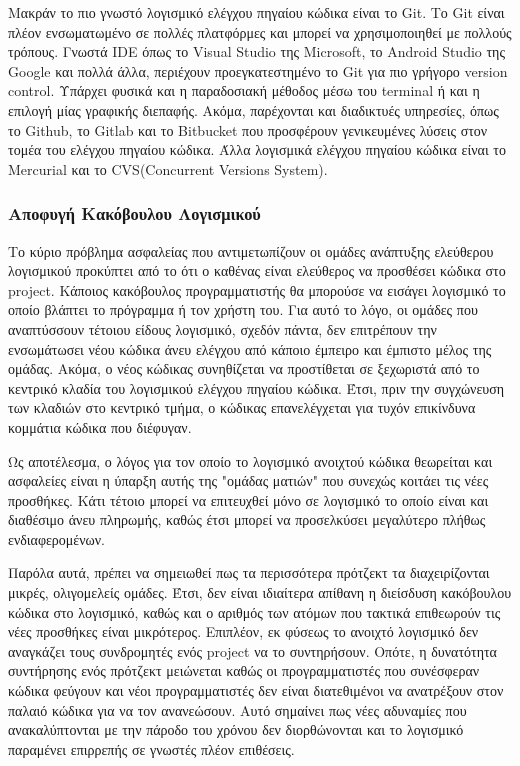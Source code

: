 \documentclass[a4paper, 11pt]{article}
\begin{document}
{{Μακράν το πιο γνωστό λογισμικό ελέγχου πηγαίου κώδικα είναι το \textlatin{Git}. Το \textlatin{Git} είναι πλέον ενσωματωμένο σε πολλές πλατφόρμες και μπορεί να χρησιμοποιηθεί με πολλούς τρόπους. Γνωστά \textlatin{IDE} όπως το \textlatin{Visual Studio} της \textlatin{Microsoft}, το \textlatin{Android Studio} της \textlatin{Google} και πολλά άλλα, περιέχουν προεγκατεστημένο το \textlatin{Git} για πιο γρήγορο \textlatin{version control}. Υπάρχει φυσικά και η παραδοσιακή μέθοδος μέσω του \textlatin{terminal} ή και η επιλογή μίας γραφικής διεπαφής. Ακόμα, παρέχονται και διαδικτυές υπηρεσίες, όπως το \textlatin{Github}, το \textlatin{Gitlab} και το \textlatin{Bitbucket} που προσφέρουν γενικευμένες λύσεις στον τομέα του ελέγχου πηγαίου κώδικα. Άλλα λογισμικά ελέγχου πηγαίου κώδικα είναι το \textlatin{Mercurial} και το \textlatin{CVS(Concurrent Versions System)}.

\subsubsection{Αποφυγή Κακόβουλου Λογισμικού}

Το κύριο πρόβλημα ασφαλείας που αντιμετωπίζουν οι ομάδες ανάπτυξης ελεύθερου λογισμικού προκύπτει από το ότι ο καθένας είναι ελεύθερος να προσθέσει κώδικα στο \textlatin{project}. Κάποιος κακόβουλος προγραμματιστής θα μπορούσε να εισάγει λογισμικό το οποίο βλάπτει το πρόγραμμα ή τον χρήστη του. Για αυτό το λόγο, οι ομάδες που αναπτύσσουν τέτοιου είδους λογισμικό, σχεδόν πάντα, δεν επιτρέπουν την ενσωμάτωσει νέου κώδικα άνευ ελέγχου από κάποιο έμπειρο και έμπιστο μέλος της ομάδας. Ακόμα, ο νέος κώδικας συνηθίζεται να προστίθεται σε ξεχωριστά από το κεντρικό κλαδία του λογισμικού ελέγχου πηγαίου κώδικα. Έτσι, πριν την συγχώνευση των κλαδιών στο κεντρικό τμήμα, ο κώδικας επανελέγχεται για τυχόν επικίνδυνα κομμάτια κώδικα που διέφυγαν.

Ως αποτέλεσμα, ο λόγος για τον οποίο το λογισμικό ανοιχτού κώδικα θεωρείται και ασφαλείες είναι η ύπαρξη αυτής της "ομάδας ματιών" που συνεχώς κοιτάει τις νέες προσθήκες. Κάτι τέτοιο μπορεί να επιτευχθεί μόνο σε λογισμικό το οποίο είναι και διαθέσιμο άνευ πληρωμής, καθώς έτσι μπορεί να προσελκύσει μεγαλύτερο πλήθως ενδιαφερομένων.

Παρόλα αυτά, πρέπει να σημειωθεί πως τα περισσότερα πρότζεκτ τα διαχειρίζονται μικρές, ολιγομελείς ομάδες. Έτσι, δεν είναι ιδιαίτερα απίθανη η διείσδυση κακόβουλου κώδικα στο λογισμικό, καθώς και ο αριθμός των ατόμων που τακτικά επιθεωρούν τις νέες προσθήκες είναι μικρότερος. Επιπλέον, εκ φύσεως το ανοιχτό λογισμικό δεν αναγκάζει τους συνδρομητές ενός \textlatin{project} να το συντηρήσουν. Οπότε, η δυνατότητα συντήρησης ενός πρότζεκτ μειώνεται καθώς οι προγραμματιστές που συνέσφεραν κώδικα φεύγουν και νέοι προγραμματιστές δεν είναι διατεθιμένοι να ανατρέξουν στον παλαιό κώδικα για να τον ανανεώσουν. Αυτό σημαίνει πως νέες αδυναμίες που ανακαλύπτονται με την πάροδο του χρόνου δεν διορθώνονται και το λογισμικό παραμένει επιρρεπής σε γνωστές πλέον επιθέσεις.

}}
\end{document}
